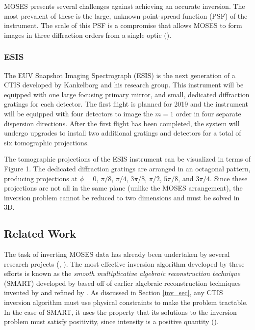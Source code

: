 \documentclass[10pt, letter]{article}
\begin{document}
				MOSES presents several challenges against achieving an accurate inversion. The most prevalent of these is the large, unknown point-spread function (PSF) of the instrument. The scale of this PSF is a compromise that allows MOSES to form images in three diffraction orders from a single optic (\cite{kankel1}).

			\subsubsection{ESIS} \label{esis_intro}
			
				The EUV Snapshot Imaging Spectrograph (ESIS) is the next generation of a CTIS developed by Kankelborg and his research group. This instrument will be equipped with one large focusing primary mirror, and small, dedicated diffraction gratings for each detector. The first flight is planned for 2019 and the instrument will be equipped with four detectors to image the $m=1$ order in four separate dispersion directions. After the first flight has been completed, the system will undergo upgrades to install two additional gratings and detectors for a total of six tomographic projections. 
				
				The tomographic projections of the ESIS instrument can be visualized in terms of Figure 1. The dedicated diffraction gratings are arranged in an octagonal pattern, producing projections at $\phi = 0$, $\pi/8$, $\pi/4$, $3 \pi / 8$, $\pi /2$, $5 \pi /8$, and $3 \pi /4$. Since these projections are not all in the same plane (unlike the MOSES arrangement), the inversion problem cannot be reduced to two dimensions and must be solved in 3D.
			
		\subsection{Related Work} \label{pwork}
			
			The task of inverting MOSES data has already been undertaken by several research projects (\cite{inversion}, \cite{fox1}). The most effective inversion algorithm developed by these efforts is known as the \textit{smooth multiplicative algebraic reconstruction technique} (SMART) developed by \cite{kankel2} based off of earlier algebraic reconstruction techniques invented by \cite{Gordon70} and refined by \cite{Okamoto:91}. As discussed in Section \ref{inv_sec}, any CTIS inversion algorithm must use physical constraints to make the problem tractable. In the case of SMART, it uses the property that its solutions to the inversion problem must satisfy positivity, since intensity is a positive quantity (\cite{kankel2}).
			
\end{document}
